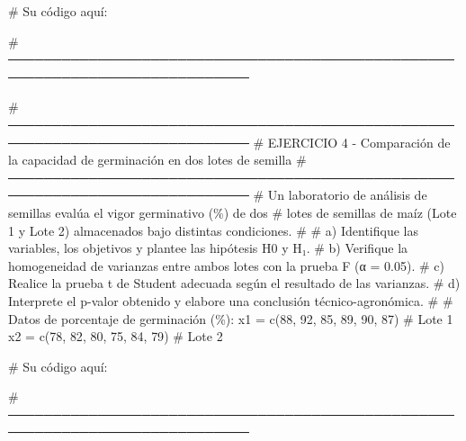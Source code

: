 \documentclass[
  spanish,
  letterpaper,
  DIV=11,
  numbers=noendperiod]{scrreprt}
\newenvironment{Shaded}{\begin{snugshade}}{\end{snugshade}}
\newcommand{\CommentTok}[1]{\textcolor[rgb]{0.37,0.37,0.37}{#1}}
\newcommand{\DecValTok}[1]{\textcolor[rgb]{0.68,0.00,0.00}{#1}}
\newcommand{\FunctionTok}[1]{\textcolor[rgb]{0.28,0.35,0.67}{#1}}
\newcommand{\NormalTok}[1]{\textcolor[rgb]{0.00,0.23,0.31}{#1}}
\newcommand{\OtherTok}[1]{\textcolor[rgb]{0.00,0.23,0.31}{#1}}
\begin{document}
\begin{Shaded}
\begin{Highlighting}[]
\CommentTok{\# Su código aquí:}

\CommentTok{\# ─────────────────────────────────────────────────────────────────────────────}


\CommentTok{\# ─────────────────────────────────────────────────────────────────────────────}
\CommentTok{\# EJERCICIO 4 {-} Comparación de la capacidad de germinación en dos lotes de semilla}
\CommentTok{\# ─────────────────────────────────────────────────────────────────────────────}
\CommentTok{\# Un laboratorio de análisis de semillas evalúa el vigor germinativo (\%) de dos}
\CommentTok{\# lotes de semillas de maíz (Lote 1 y Lote 2) almacenados bajo distintas condiciones.}
\CommentTok{\#}
\CommentTok{\# a) Identifique las variables, los objetivos y plantee las hipótesis H0 y H₁.}
\CommentTok{\# b) Verifique la homogeneidad de varianzas entre ambos lotes con la prueba F (α = 0.05).}
\CommentTok{\# c) Realice la prueba t de Student adecuada según el resultado de las varianzas.}
\CommentTok{\# d) Interprete el p{-}valor obtenido y elabore una conclusión técnico{-}agronómica.}
\CommentTok{\#}
\CommentTok{\# Datos de porcentaje de germinación (\%):}
\NormalTok{x1 }\OtherTok{=} \FunctionTok{c}\NormalTok{(}\DecValTok{88}\NormalTok{, }\DecValTok{92}\NormalTok{, }\DecValTok{85}\NormalTok{, }\DecValTok{89}\NormalTok{, }\DecValTok{90}\NormalTok{, }\DecValTok{87}\NormalTok{)   }\CommentTok{\# Lote 1}
\NormalTok{x2 }\OtherTok{=} \FunctionTok{c}\NormalTok{(}\DecValTok{78}\NormalTok{, }\DecValTok{82}\NormalTok{, }\DecValTok{80}\NormalTok{, }\DecValTok{75}\NormalTok{, }\DecValTok{84}\NormalTok{, }\DecValTok{79}\NormalTok{)   }\CommentTok{\# Lote 2}

\CommentTok{\# Su código aquí:}

\CommentTok{\# ─────────────────────────────────────────────────────────────────────────────}



\end{Highlighting}
\end{Shaded}
\end{document}

